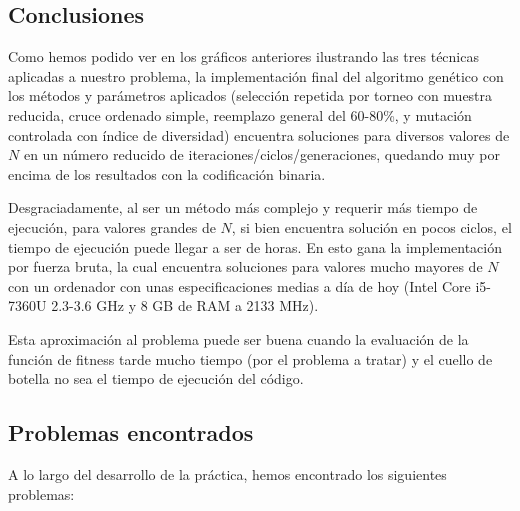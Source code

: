 \documentclass[12pt]{article}
\begin{document}
\subsection{Conclusiones}

Como hemos podido ver en los gráficos anteriores ilustrando las tres técnicas aplicadas a nuestro problema, la implementación final del algoritmo genético con los métodos y parámetros aplicados (selección repetida por torneo con muestra reducida, cruce ordenado simple, reemplazo general del 60-80\%, y mutación controlada con índice de diversidad) encuentra soluciones para diversos valores de $N$ en un número reducido de iteraciones/ciclos/generaciones, quedando muy por encima de los resultados con la codificación binaria.

Desgraciadamente, al ser un método más complejo y requerir más tiempo de ejecución, para valores grandes de $N$, si bien encuentra solución en pocos ciclos, el tiempo de ejecución puede llegar a ser de horas. En esto gana la implementación por fuerza bruta, la cual encuentra soluciones para valores mucho mayores de $N$ con un ordenador con unas especificaciones medias a día de hoy (Intel Core i5-7360U 2.3-3.6 GHz y 8 GB de RAM a 2133 MHz).

Esta aproximación al problema puede ser buena cuando la evaluación de la función de fitness tarde mucho tiempo (por el problema a tratar) y el cuello de botella no sea el tiempo de ejecución del código.

\subsection{Problemas encontrados}

A lo largo del desarrollo de la práctica, hemos encontrado los siguientes problemas:
\end{document}
